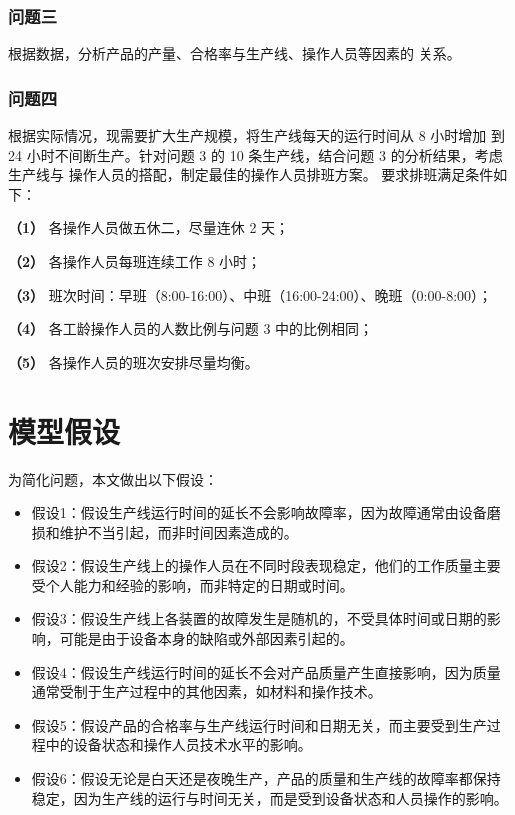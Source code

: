 \documentclass[withoutpreface,bwprint]{cumcmthesis}
\begin{document}
\subsubsection{问题三} 根据数据，分析产品的产量、合格率与生产线、操作人员等因素的 
关系。 

\subsubsection{问题四} 根据实际情况，现需要扩大生产规模，将生产线每天的运行时间从 8 小时增加 到 24 小时不间断生产。针对问题 3 的 10 条生产线，结合问题 3 的分析结果，考虑生产线与 
操作人员的搭配，制定最佳的操作人员排班方案。
要求排班满足条件如下：

\textbf{（1）} 各操作人员做五休二，尽量连休 2 天； 

\textbf{（2）} 各操作人员每班连续工作 8 小时；

\textbf{（3）} 班次时间：早班（8:00-16:00）、中班（16:00-24:00）、晚班（0:00-8:00）；

\textbf{（4）} 各工龄操作人员的人数比例与问题 3 中的比例相同；

\textbf{（5）} 各操作人员的班次安排尽量均衡。


\section{模型假设}

为简化问题，本文做出以下假设：

\begin{itemize}[itemindent=2em]

\item 假设1：假设生产线运行时间的延长不会影响故障率，因为故障通常由设备磨损和维护不当引起，而非时间因素造成的。

\item 假设2：假设生产线上的操作人员在不同时段表现稳定，他们的工作质量主要受个人能力和经验的影响，而非特定的日期或时间。

\item 假设3：假设生产线上各装置的故障发生是随机的，不受具体时间或日期的影响，可能是由于设备本身的缺陷或外部因素引起的。

\item 假设4：假设生产线运行时间的延长不会对产品质量产生直接影响，因为质量通常受制于生产过程中的其他因素，如材料和操作技术。

\item 假设5：假设产品的合格率与生产线运行时间和日期无关，而主要受到生产过程中的设备状态和操作人员技术水平的影响。

\item 假设6：假设无论是白天还是夜晚生产，产品的质量和生产线的故障率都保持稳定，因为生产线的运行与时间无关，而是受到设备状态和人员操作的影响。

\end{itemize}
\end{document}
